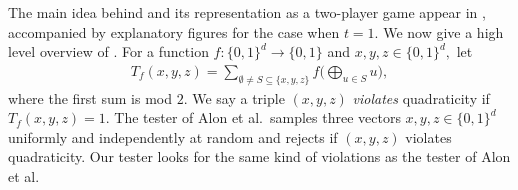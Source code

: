 \documentclass{toc}
\begin{document}
%
The main idea behind  and its representation as a two-player game appear in , accompanied by explanatory figures for the case when $t=1$. 
We now give a high level overview of .
For a function $f \colon \{0,1\}^d \to \{0,1\}$ and $x,y,z \in \{0,1\}^d,$ let 
\begin{align*}
T_f(x, y, z) = \sum_{\emptyset \neq S \subseteq \{x,y,z\}} f\bigl( \bigoplus_{u\in S} u \bigr), 
\end{align*}
where the first sum is mod $2$. We say a triple $(x, y, z)$ \emph{violates} quadraticity if $T_f(x,y,z) = 1$. 
The tester of Alon et al.~samples three vectors $x,y,z \in \{0,1\}^d$ uniformly and independently at random and rejects if $(x,y,z)$ violates quadraticity. Our tester looks for the same kind of violations as the tester of Alon et al.
\end{document}
